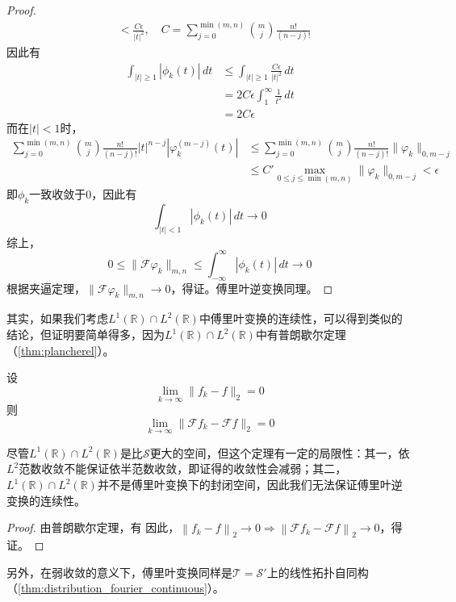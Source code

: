 \begin{proof}
\begin{align*}
                    & <\frac{C\epsilon}{|t|^2},\quad C=\sum_{j=0}^{\min(m,n)}\binom{m}{j}\frac{n!}{(n-j)!}
    \end{align*}
    因此有\begin{align*}
        \int_{|t|\geq 1}|\phi_k(t)|\,dt & \leq \int_{|t|\geq 1}\frac{C\epsilon}{|t|^2}\,dt \\
                                        & =2C\epsilon\int_{1}^{\infty}\frac{1}{t^2}\,dt    \\
                                        & =2C\epsilon
    \end{align*}
    而在$|t|<1$时，\begin{align*}
        \sum_{j=0}^{\min(m,n)}\binom{m}{j}\frac{n!}{(n-j)!}|t|^{n-j}\left|\varphi_k^{(m-j)}(t)\right| & \leq \sum_{j=0}^{\min(m,n)}\binom{m}{j}\frac{n!}{(n-j)!}\|\varphi_k\|_{0,m-j} \\
                                                                                                      & \leq C'\max_{0\leq j\leq \min(m,n)}\|\varphi_k\|_{0,m-j}<\epsilon
    \end{align*}
    即$\phi_k$一致收敛于0，因此有
    \[\int_{|t|<1}|\phi_k(t)|\,dt\to 0\]
    综上，\[0\leq\|\mathcal{F} \varphi_k\|_{m,n}\leq\int_{-\infty}^{\infty}|\phi_k(t)|\,dt\to 0\]
    根据夹逼定理，$\|\mathcal{F} \varphi_k\|_{m,n}\to 0$，得证。傅里叶逆变换同理。
\end{proof}

其实，如果我们考虑$L^1(\mathbb{R})\cap L^2(\mathbb{R})$中傅里叶变换的连续性，可以得到类似的结论，但证明要简单得多，因为$L^1(\mathbb{R})\cap L^2(\mathbb{R})$中有普朗歇尔定理（\cref{thm:plancherel}）。
\begin{theorem}
    设
    $$\lim_{k\to\infty}\|f_k-f\|_2=0$$
    则
    $$\lim_{k\to\infty}\|\mathcal{F}f_k-\mathcal{F}f\|_2=0$$
\end{theorem}
\begin{remark}
    尽管$L^1(\mathbb{R})\cap L^2(\mathbb{R})$是比$\mathcal{S} $更大的空间，但这个定理有一定的局限性：其一，依$L^2$范数收敛不能保证依半范数收敛，即证得的收敛性会减弱；其二，$L^1(\mathbb{R})\cap L^2(\mathbb{R})$并不是傅里叶变换下的封闭空间，因此我们无法保证傅里叶逆变换的连续性。
\end{remark}
\begin{proof}
    由普朗歇尔定理，有
    因此，$\left\|f_k-f\right\|_2\to 0\Rightarrow \left\|\mathcal{F} f_k-\mathcal{F} f\right\|_2\to 0$，得证。
\end{proof}

另外，在弱收敛的意义下，傅里叶变换同样是$\mathcal{T} =\mathcal{S} ' $上的线性拓扑自同构（\cref{thm:distribution_fourier_continuous}）。
